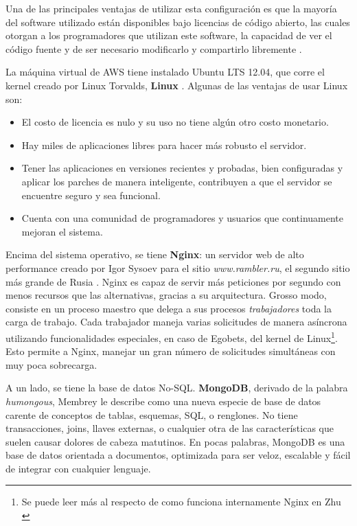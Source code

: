 Una de las principales ventajas de utilizar esta configuración es que la mayoría del software utilizado están disponibles bajo licencias de código abierto, las cuales otorgan a los programadores que utilizan este software, la capacidad de ver el código fuente y de ser necesario modificarlo y compartirlo libremente \cite{lozano2008software}.

La máquina virtual de AWS tiene instalado Ubuntu LTS 12.04, que corre el kernel creado por Linux Torvalds, \textbf{Linux} \cite{torvalds2001just}. Algunas de las ventajas de usar Linux son:
		\begin{itemize}
 			\item El costo de licencia es nulo y su uso no tiene algún otro costo monetario.
 			\item Hay miles de aplicaciones libres para hacer más robusto el servidor.
 			\item Tener las aplicaciones en versiones recientes y probadas, bien configuradas y aplicar los parches de manera inteligente, contribuyen a que el servidor se encuentre seguro y sea funcional.
 			\item Cuenta con una comunidad de programadores y usuarios que continuamente mejoran el sistema.
 		\end{itemize}

Encima del sistema operativo, se tiene \textbf{Nginx}: un servidor web de alto performance creado por Igor Sysoev para el sitio \emph{www.rambler.ru}, el segundo sitio más grande de Rusia \cite{reese2008nginx}. Nginx es capaz de servir más peticiones por segundo con menos recursos que las alternativas, gracias a su arquitectura. Grosso modo, consiste en un proceso maestro que delega a sus procesos \emph{trabajadores} toda la carga de trabajo. Cada trabajador maneja varias solicitudes de manera asíncrona utilizando funcionalidades especiales, en caso de Egobets, del kernel de Linux\footnote{Se puede leer más al respecto de como funciona internamente Nginx en Zhu \cite{zhu2010nginx}}. Esto permite a Nginx, manejar un gran número de solicitudes simultáneas con muy poca sobrecarga.

A un lado, se tiene la base de datos No-SQL. \textbf{MongoDB}, derivado de la palabra \emph{humongous}, Membrey \cite{membrey2010definitive} le describe como una nueva especie de base de datos carente de conceptos de tablas, esquemas, SQL, o renglones. No tiene transacciones, joins, llaves externas, o cualquier otra de las características que suelen causar dolores de cabeza matutinos. En pocas palabras, MongoDB es una base de datos orientada a documentos, optimizada para ser veloz, escalable y fácil de integrar con cualquier lenguaje.


